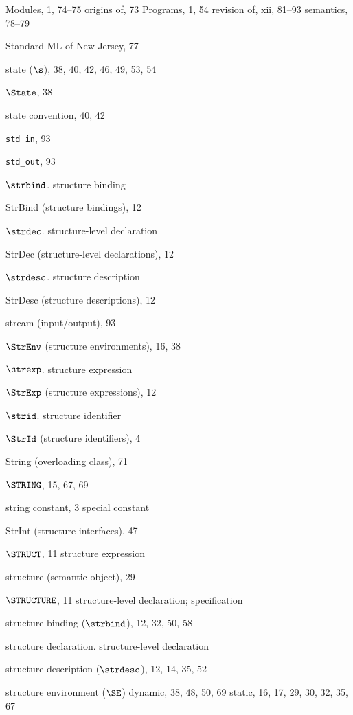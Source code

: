 \begin{theindex}
\subitem Modules, 1, 74--75
\subitem origins of, 73
\subitem Programs, 1, 54
\subitem revision of, xii, 81--93
\subitem semantics, 78--79
\item Standard ML of New Jersey, 77
\item state ($\s$), 38, 40, 42, 46, 49, 53, 54
\item $\State$, 38
\item state convention, 40, 42
\item \verb+std_in+, 93
\item \verb+std_out+, 93
\item $\strbind$. \see structure binding
\item StrBind (structure bindings), 12
\item $\strdec$. \see structure-level declaration
\item StrDec (structure-level declarations), 12
\item $\strdesc$. \see structure description
\item StrDesc (structure descriptions), 12
\item stream (input/output),  93
\item $\StrEnv$ (structure environments), 16, 38
\item $\strexp$. \see  structure expression
\item $\StrExp$ (structure expressions), 12
\item $\strid$. \see structure identifier
\item $\StrId$ (structure identifiers), 4
\item String (overloading class), 71
\item $\STRING$, 15, 67, 69
\item string constant, 3
\subitem \seealso special constant
\item StrInt (structure interfaces), 47
\item $\STRUCT$, 11
\subitem \seealso structure expression
\item structure (semantic object), 29
\item $\STRUCTURE$, 11
\subitem \seealso structure-level declaration; specification
\item structure binding ($\strbind$), 12, 32, 50, 58
\item structure declaration. \see structure-level declaration
\item structure description ($\strdesc$), 12, 14, 35, 52
\item structure environment ($\SE$)
\subitem dynamic, 38, 48, 50, 69
\subitem static, 16,  17, 29, 30, 32, 35, 67

\end{theindex}
